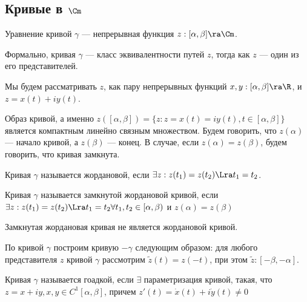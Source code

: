 \subsection{Кривые в \(\Cm\)}

\begin{definition}
    Уравнение кривой \(\gamma\) --- непрерывная функция \(z: [\alpha, \beta] \ra \Cm\).
\end{definition}

\begin{note}
    Формально, кривая \(\gamma\) --- класс эквивалентности путей \(z\), тогда как \(z\) --- один из его представителей.
\end{note}

Мы будем рассматривать \(z\), как пару непрерывных функций \(x, y: [\alpha, \beta] \ra \R\), и \(z = x(t) + iy(t)\).

\begin{note}
    Образ кривой, а именно \(z([\alpha, \beta]) = \{z: z = x(t) = iy(t), t \in [\alpha, \beta]\}\) является компактным линейно связным множеством. Будем говорить, что \(z(\alpha)\) --- начало кривой, а \(z(\beta)\) --- конец. В случае, если \(z(\alpha) = z(\beta)\), будем говорить, что кривая замкнута.
\end{note}

\begin{definition}
    Кривая \(\gamma\) называется жордановой, если \(\exists z: z(t_1) = z(t_2) \Lra t_1 = t_2\).
\end{definition}

\begin{definition}
    Кривая \(\gamma\) называется замкнутой жордановой кривой, если \(\exists z: z(t_1) = z(t_2) \Lra t_1 = t_2 \forall t_1, t_2 \in [\alpha, \beta)\) и \(z(\alpha) = z(\beta)\)
\end{definition}

\begin{note}
    Замкнутая жордановая кривая не является жордановой кривой.
\end{note}

\begin{definition}
    По кривой \(\gamma\) построим кривую \(-\gamma\) следующим образом: для любого представителя \(z\) кривой \(\gamma\) рассмотрим \(\tilde z(t) = z(-t)\), при этом \(\tilde z: [-\beta, -\alpha]\).
\end{definition}

\begin{definition}
    Кривая \(\gamma\) называется гоадкой, если \(\exists\) параметризация кривой, такая, что \(z = x + iy, x, y \in C^1[\alpha, \beta]\), причем \(z'(t) = \dot x(t) + i\dot y(t) \ne 0\)
\end{definition}

